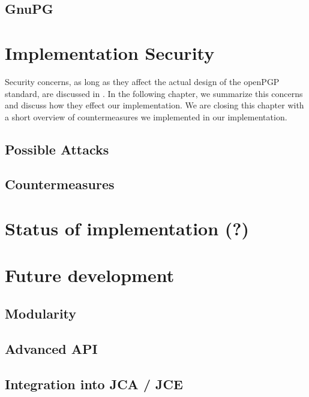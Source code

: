 \subsection{GnuPG}


\section{Implementation Security}

Security concerns, as long as they affect the actual design of the openPGP standard, are discussed in \citep[section 14]{RFC4880}. In the following chapter, we summarize this concerns and discuss how they effect our implementation. We are closing this chapter with a short overview of countermeasures we implemented in our implementation.

\subsection{Possible Attacks}


\subsection{Countermeasures}


\section{Status of implementation (?)}


\section{Future development}

\subsection{Modularity}

\subsection{Advanced API}

\subsection{Integration into JCA / JCE}